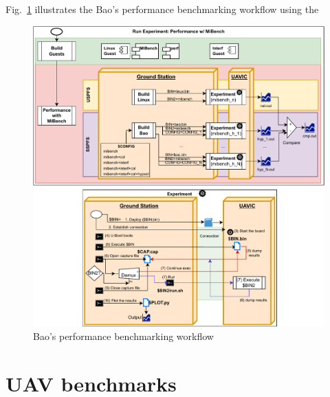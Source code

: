 Fig.~\ref{fig:uav-main-eval-mibench-1} illustrates the Bao's performance
benchmarking workflow using the 
\begin{figure}[!hbt]
  \centering
  \includegraphics[width=1.0\textwidth]{./img/pdf/uav-main-eval-mibench-1} 
%   
  \caption{Bao's performance benchmarking workflow}%
  \label{fig:uav-main-eval-mibench-1}
\end{figure}


\section{UAV benchmarks}
\label{sec:uav-benchmarks}




